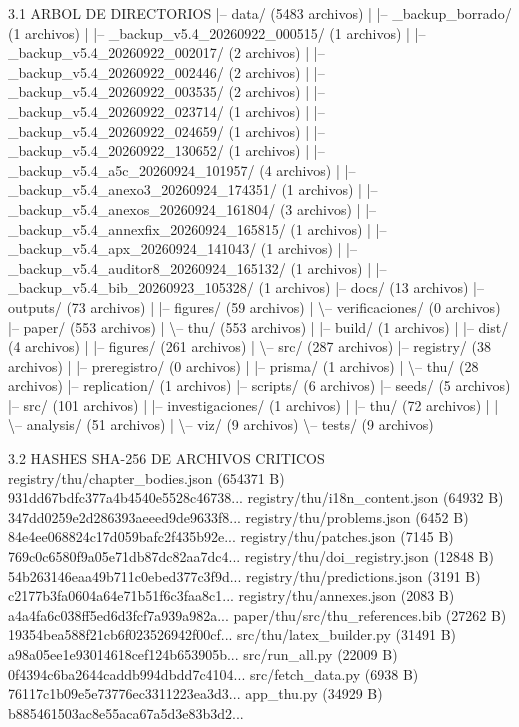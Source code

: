 ﻿\documentclass[11pt,letterpaper]{article}
\begin{document}
3.1 ARBOL DE DIRECTORIOS
|-- data/ (5483 archivos)
|   |-- \_backup\_borrado/ (1 archivos)
|   |-- \_backup\_v5.4\_20260922\_000515/ (1 archivos)
|   |-- \_backup\_v5.4\_20260922\_002017/ (2 archivos)
|   |-- \_backup\_v5.4\_20260922\_002446/ (2 archivos)
|   |-- \_backup\_v5.4\_20260922\_003535/ (2 archivos)
|   |-- \_backup\_v5.4\_20260922\_023714/ (1 archivos)
|   |-- \_backup\_v5.4\_20260922\_024659/ (1 archivos)
|   |-- \_backup\_v5.4\_20260922\_130652/ (1 archivos)
|   |-- \_backup\_v5.4\_a5c\_20260924\_101957/ (4 archivos)
|   |-- \_backup\_v5.4\_anexo3\_20260924\_174351/ (1 archivos)
|   |-- \_backup\_v5.4\_anexos\_20260924\_161804/ (3 archivos)
|   |-- \_backup\_v5.4\_annexfix\_20260924\_165815/ (1 archivos)
|   |-- \_backup\_v5.4\_apx\_20260924\_141043/ (1 archivos)
|   |-- \_backup\_v5.4\_auditor8\_20260924\_165132/ (1 archivos)
|   |-- \_backup\_v5.4\_bib\_20260923\_105328/ (1 archivos)
|-- docs/ (13 archivos)
|-- outputs/ (73 archivos)
|   |-- figures/ (59 archivos)
|   \textbackslash{}-- verificaciones/ (0 archivos)
|-- paper/ (553 archivos)
|   \textbackslash{}-- thu/ (553 archivos)
|       |-- build/ (1 archivos)
|       |-- dist/ (4 archivos)
|       |-- figures/ (261 archivos)
|       \textbackslash{}-- src/ (287 archivos)
|-- registry/ (38 archivos)
|   |-- preregistro/ (0 archivos)
|   |-- prisma/ (1 archivos)
|   \textbackslash{}-- thu/ (28 archivos)
|-- replication/ (1 archivos)
|-- scripts/ (6 archivos)
|-- seeds/ (5 archivos)
|-- src/ (101 archivos)
|   |-- investigaciones/ (1 archivos)
|   |-- thu/ (72 archivos)
|   |   \textbackslash{}-- analysis/ (51 archivos)
|   \textbackslash{}-- viz/ (9 archivos)
\textbackslash{}-- tests/ (9 archivos)

3.2 HASHES SHA-256 DE ARCHIVOS CRITICOS
  registry/thu/chapter\_bodies.json  (654371 B)  931dd67bdfc377a4b4540e5528c46738...
  registry/thu/i18n\_content.json  (64932 B)  347dd0259e2d286393aeeed9de9633f8...
  registry/thu/problems.json  (6452 B)  84e4ee068824c17d059bafc2f435b92e...
  registry/thu/patches.json  (7145 B)  769c0c6580f9a05e71db87dc82aa7dc4...
  registry/thu/doi\_registry.json  (12848 B)  54b263146eaa49b711c0ebed377c3f9d...
  registry/thu/predictions.json  (3191 B)  c2177b3fa0604a64e71b51f6c3faa8c1...
  registry/thu/annexes.json  (2083 B)  a4a4fa6c038ff5ed6d3fcf7a939a982a...
  paper/thu/src/thu\_references.bib  (27262 B)  19354bea588f21cb6f023526942f00cf...
  src/thu/latex\_builder.py  (31491 B)  a98a05ee1e93014618cef124b653905b...
  src/run\_all.py  (22009 B)  0f4394c6ba2644caddb994dbdd7c4104...
  src/fetch\_data.py  (6938 B)  76117c1b09e5e73776ec3311223ea3d3...
  app\_thu.py  (34929 B)  b885461503ac8e55aca67a5d3e83b3d2...
\end{document}
